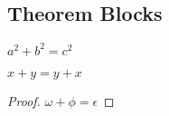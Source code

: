 \subsection{Theorem Blocks}
\begin{thm}[Pythagoras]
    $ a^2 + b^2 = c^2$
\end{thm}
\begin{cor}
    $ x + y = y + x  $
\end{cor}
\begin{proof}
    $\omega +\phi = \epsilon $
\end{proof}

